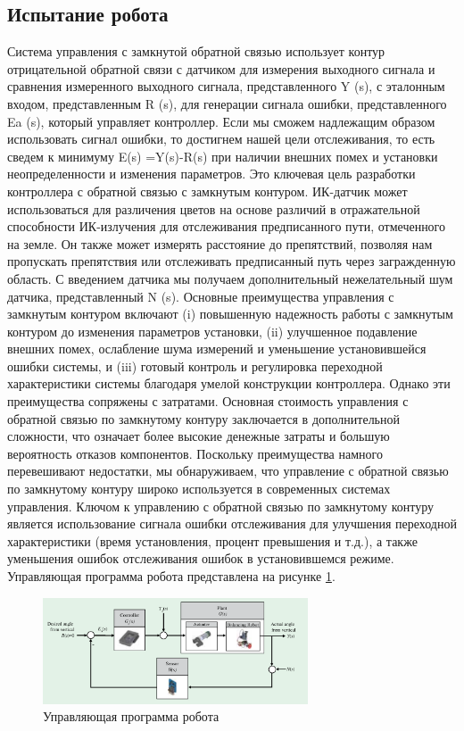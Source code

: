\subsection{Испытание робота}
Система управления с замкнутой обратной связью использует контур отрицательной обратной связи с датчиком для измерения выходного сигнала и
сравнения измеренного выходного сигнала, представленного Y (s), с эталонным входом, представленным R (s), для генерации сигнала
ошибки, представленного Ea (s), который управляет контроллер. Если мы сможем надлежащим образом использовать сигнал ошибки, то
достигнем нашей цели отслеживания, то есть сведем к минимуму E(s) =Y(s)-R(s) при наличии внешних помех и установки
неопределенности и изменения параметров. Это ключевая цель разработки контроллера с обратной связью с замкнутым контуром. ИК-датчик
может использоваться для различения цветов на основе различий в отражательной способности ИК-излучения для отслеживания предписанного пути, отмеченного на
земле. Он также может измерять расстояние до препятствий, позволяя нам пропускать препятствия или отслеживать предписанный путь через
загражденную область. С введением датчика мы получаем дополнительный нежелательный шум датчика, представленный
N (s). Основные преимущества управления с замкнутым контуром включают (i) повышенную надежность работы с замкнутым контуром до
изменения параметров установки, (ii) улучшенное подавление внешних помех, ослабление шума измерений
и уменьшение установившейся ошибки системы, и (iii) готовый контроль и регулировка переходной характеристики
системы благодаря умелой конструкции контроллера. Однако эти преимущества сопряжены с затратами. Основная стоимость
управления с обратной связью по замкнутому контуру заключается в дополнительной сложности, что означает более высокие денежные затраты и большую вероятность
отказов компонентов. Поскольку преимущества намного перевешивают недостатки, мы обнаруживаем, что управление с обратной связью по замкнутому контуру широко используется
в современных системах управления. Ключом к управлению с обратной связью по замкнутому контуру является использование сигнала ошибки отслеживания для улучшения
переходной характеристики (время установления, процент превышения и т.д.), а также уменьшения ошибок отслеживания ошибок в установившемся режиме.
Управляющая программа робота представлена на рисунке \ref{1prog}.
\begin{figure}[h]
    \centering
    \includegraphics[width=0.7\textwidth]{fig/assembly/1.8.png}
    \caption{Управляющая программа робота}
    \label{1prog}
\end{figure}


